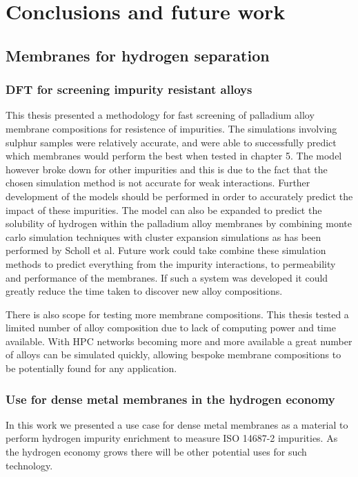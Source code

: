 \chapter{Conclusions and future work}

\section{Membranes for hydrogen separation}
\subsection{DFT for screening impurity resistant alloys}\label{simconc}
This thesis presented a methodology for fast screening of palladium alloy membrane compositions for resistence of impurities. The simulations involving sulphur samples were relatively accurate, and were able to successfully predict which membranes would perform the best when tested in chapter 5. The model however broke down for other impurities and this is due to the fact that the chosen simulation method is not accurate for weak interactions. \cite{dftbook1} Further development of the models should be performed in order to accurately predict the impact of these impurities. The model can also be expanded to predict the solubility of hydrogen within the palladium alloy membranes by combining monte carlo simulation techniques with cluster expansion simulations as has been performed by Scholl et al. \cite{SHOLL2007462} Future work could take combine these simulation methods to predict everything from the impurity interactions, to permeability and performance of the membranes. If such a system was developed it could greatly reduce the time taken to discover new alloy compositions. 

There is also scope for testing more membrane compositions. This thesis tested a limited number of alloy composition due to lack of computing power and time available. With HPC networks becoming more and more available \cite{morgan_burt_feldman_2020} a great number of alloys can be simulated quickly, allowing bespoke membrane compositions to be potentially found for any application. 


\subsection{Use for dense metal membranes in the hydrogen economy}
In this work we presented a use case for dense metal membranes as a material to perform hydrogen impurity enrichment to measure ISO 14687-2 impurities. As the hydrogen economy grows there will be other potential uses for such technology. 

